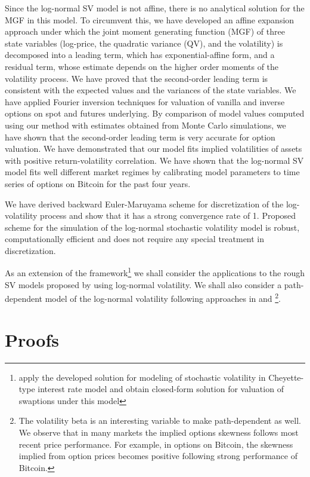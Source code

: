 \documentclass[pdftex,11pt,a4paper] {article}
\begin{document}
Since the log-normal SV model is not affine, there is no analytical solution for the MGF in this model. To circumvent this, we have developed an affine expansion approach under which the joint moment generating function (MGF) of three state variables (log-price, the quadratic variance (QV), and the volatility) is decomposed into a leading term, which has exponential-affine form, and a residual term, whose estimate depends on the higher order moments of the volatility process. We have proved that the second-order leading term is consistent with the expected values and the variances of the state variables. We have applied Fourier inversion techniques for valuation of vanilla and inverse options on spot and futures underlying. By comparison of model values computed using our method with estimates obtained from Monte Carlo simulations, we have shown that the second-order leading term is very accurate for option valuation. We have demonstrated that our model fits implied volatilities of assets with positive return-volatility correlation. We have shown that the log-normal SV model fits well different market regimes by calibrating model parameters to time series of options on Bitcoin for the past four years.

We have derived backward Euler-Maruyama scheme for discretization of the log-volatility process and show that it has a strong convergence rate of 1. Proposed scheme for the simulation of the log-normal stochastic volatility model is robust, computationally efficient and does not require any special treatment in discretization. 

As an extension of the framework\footnote{\cite{SeppRakhmonov2023a} apply the developed solution for modeling of stochastic volatility in Cheyette-type interest rate model and obtain closed-form solution for valuation of swaptions under this model} we shall consider the applications to the rough SV models proposed by \cite{Gatheral} using log-normal volatility. We shall also consider a path-dependent model of the log-normal volatility following approaches in \cite{Guyon2023} and \cite{Lipton2023}\footnote{The volatility beta is an interesting variable to make path-dependent as well. We observe that in many markets the implied options skewness follows most recent price performance. For example, in options on Bitcoin, the skewness implied from option prices becomes positive following strong performance of Bitcoin.}.




\appendix
\section{Proofs}\label{sec:appendix}
\end{document}
